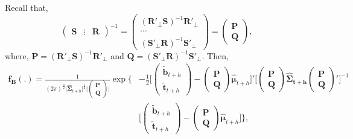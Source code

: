 \documentclass[a4paper, 11pt]{article}
\begin{document}
Recall that,
$$
\begin{pmatrix}\bm{S} & \vdots& \bm{R}\end{pmatrix}^{-1} =
\begin{pmatrix}(\bm{R}'_\bot \bm{S})^{-1}\bm{R}'_\bot \\ \cdots \\ (\bm{S}'_\bot \bm{R})^{-1}\bm{S}'_\bot \end{pmatrix} =
\begin{pmatrix}
\bm{P} \\\bm{Q}
\end{pmatrix},
$$
where, $\bm{P}=(\bm{R}'_\bot \bm{S})^{-1}\bm{R}'_\bot$ and $\bm{Q}=(\bm{S}'_\bot \bm{R})^{-1}\bm{S}'_\bot$. Then,
\begin{align*}
\bm{f_B}(.)=\frac{1}{(2\pi)^{\frac{n}{2}}\Big|\bm{\hat{\Sigma}}_{t+h}\Big|^{\frac{1}{2}}\Big|\begin{pmatrix}\bm{P}\\\bm{Q}\end{pmatrix} \Big|}
\exp \Big\{&-\frac{1}{2}\Big[\begin{pmatrix}\tilde{\bm{b}}_{t+h}\\ \tilde{\bm{t}}_{t+h}\end{pmatrix}-\begin{pmatrix}\bm{P}\\\bm{Q}\end{pmatrix}\bm{\hat{\mu}}_{t+h}\Big]'\Big[\begin{pmatrix}\bm{P}\\\bm{Q}\end{pmatrix}\bm{\hat{\Sigma}_{t+h}}\begin{pmatrix}\bm{P}\\\bm{Q}\end{pmatrix}'\Big]^{-1}\\
&\Big[\begin{pmatrix}\tilde{\bm{b}}_{t+h}\\ \tilde{\bm{t}}_{t+h}\end{pmatrix}-\begin{pmatrix}\bm{P}\\\bm{Q}\end{pmatrix}\bm{\hat{\mu}}_{t+h}\Big] \Big\},
\end{align*}
\end{document}

